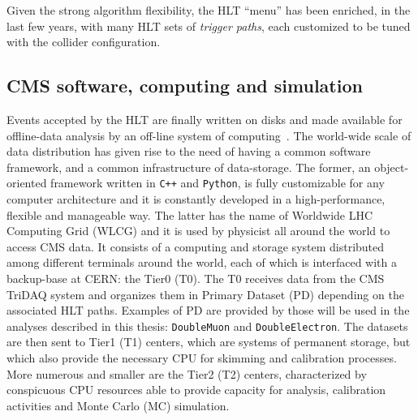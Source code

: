 Given the strong algorithm flexibility, the HLT ``menu'' has been enriched, in the last few years, 
with many HLT sets of \emph{trigger paths}, each customized to be tuned with the collider configuration.

\subsection{CMS software, computing and simulation}
\label{subsec:CMSsim}

Events accepted by the HLT are finally written on disks and made available for offline-data analysis by an off-line system of computing~\cite{CMS:2005aa}.
The world-wide scale of data distribution has given rise to the need of having a common software framework,
and a common infrastructure of data-storage. The former, an object-oriented framework written in \texttt{C++} and \texttt{Python},
is fully customizable for any computer architecture and it is constantly developed in a high-performance, flexible and manageable way. 
The latter has the name of Worldwide LHC Computing Grid (WLCG) and it is used by physicist all around the world to access CMS data. 
It consists of a computing and storage system distributed among different terminals around the world, each of which is interfaced with a backup-base at CERN: the Tier0 (T0).
The T0 receives data from the CMS TriDAQ system and organizes them in Primary Dataset (PD) depending on the associated HLT paths. 
Examples of PD are provided by those will be used in the analyses described in this thesis: \texttt{DoubleMuon} and \texttt{DoubleElectron}.
The datasets are then sent to Tier1 (T1) centers, which are systems of permanent storage, but which also provide the necessary CPU for
skimming and calibration processes. More numerous and smaller are the Tier2 (T2) centers, characterized by conspicuous CPU resources able
to provide capacity for analysis, calibration activities and Monte Carlo (MC) simulation. 


